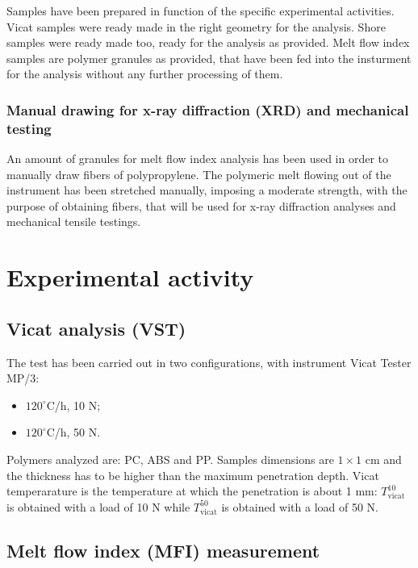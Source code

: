 \documentclass[a4paper, 11pt]{article}
\begin{document}
Samples have been prepared in function of the specific experimental activities. Vicat samples were ready made in the right geometry for the analysis. Shore samples were ready made too, ready for the analysis as provided. Melt flow index samples are polymer granules as provided, that have been fed into the insturment for the analysis without any further processing of them. 

\subsubsection{Manual drawing for x-ray diffraction (XRD) and mechanical testing}

An amount of granules for melt flow index analysis has been used in order to manually draw fibers of polypropylene. The polymeric melt flowing out of the instrument has been stretched manually, imposing a moderate strength, with the purpose of obtaining fibers, that will be used for x-ray diffraction analyses and mechanical tensile testings.  

\section{Experimental activity}

\subsection{Vicat analysis (VST)}

The test has been carried out in two configurations, with instrument Vicat Tester MP/3:

\begin{itemize}

\item $120^\circ$C/h, 10 N;

\item $120^\circ$C/h, 50 N.

\end{itemize}
Polymers analyzed are: PC, ABS and PP. Samples dimensions are $1\times1$ cm and the thickness has to be higher than the maximum penetration depth. Vicat temperarature is the temperature at which the penetration is about 1 mm: $T_\text{vicat}^\text{10}$ is obtained with a load of 10 N while $T_\text{vicat}^\text{50}$ is obtained with a load of 50 N. 

\subsection{Melt flow index (MFI) measurement}
\end{document}
